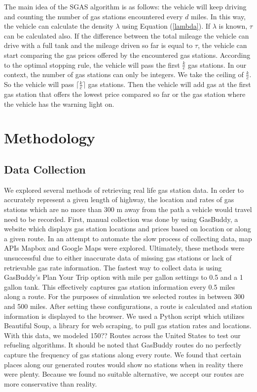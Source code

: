 \documentclass[conference]{IEEEtran}
\theoremstyle{definition}
\begin{document}
The main idea of the SGAS algorithm is as follows: the vehicle will keep driving and counting the number of gas stations encountered every $d$ miles. In this way, the vehicle can calculate the density $\lambda$ using Equation (\ref{lambda}). If $\lambda$ is known, $\tau$ can be calculated also. If the difference between the total mileage the vehicle can drive with a full tank and the mileage driven so far is equal to $\tau$, the vehicle can start comparing the gas prices offered by the encountered gas stations. According to the optimal stopping rule, the vehicle will pass the first $\frac{k}{e}$ gas stations. In our context, the number of gas stations can only be integers. We take the ceiling of $\frac{k}{e}$. So the vehicle will pass $\lceil\frac{k}{e}\rceil$ gas stations. Then the vehicle will add gas at the first gas station that offers the lowest price compared so far or the gas station where the vehicle has the warning light on.
\section{Methodology}
\subsection{Data Collection}
We explored several methods of retrieving real life gas station data. In order to accurately represent a given length of highway, the location and rates of gas stations which are no more than 300 m away from the path a vehicle would travel need to be recorded. First, manual collection was done by using GasBuddy, a website which displays gas station locations and prices based on location or along a given route. In an attempt to automate the slow process of collecting data, map APIs Mapbox and Google Maps were explored. Ultimately, these methods were unsuccessful due to either inaccurate data of missing gas stations or lack of retrievable gas rate information. The fastest way to collect data is using GasBuddy’s Plan Your Trip option with mile per gallon settings to 0.5 and a 1 gallon tank. This effectively captures gas station information every 0.5 miles along a route. For the purposes of simulation we selected routes in between 300 and 500 miles. After setting these configurations, a route is calculated and station information is displayed to the browser. We used a Python script which utilizes Beautiful Soup, a library for web scraping, to pull gas station rates and locations. With this data, we modeled 150?? Routes across the United States to test our refueling algorithms. It should be noted that GasBuddy routes do no perfectly capture the frequency of gas stations along every route. We found that certain places along our generated routes would show no stations when in reality there were plenty. Because we found no suitable alternative, we accept our routes are more conservative than reality.
\end{document}
